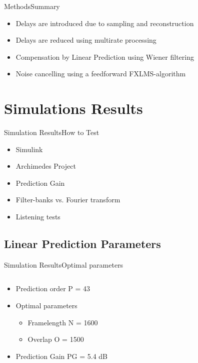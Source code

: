 \begin{frame}{Methods}{Summary}	
\begin{itemize}
	\item Delays are introduced due to sampling and reconstruction
	\item Delays are reduced using multirate processing
	\item Compensation by Linear Prediction using Wiener filtering
	\item Noise cancelling using a feedforward FXLMS-algorithm
\end{itemize}
\end{frame}










\section{Simulations Results}


\begin{frame}{Simulation Results}{How to Test}	
\begin{itemize}
	\item Simulink 
	\item Archimedes Project
	\item Prediction Gain
	\item Filter-banks vs. Fourier transform
	\item Listening tests			
\end{itemize}
\end{frame}

\subsection{Linear Prediction Parameters}
\begin{frame}{Simulation Results}{Optimal parameters}		
\begin{columns}
	\begin{column}{0.4\textwidth}
		\begin{itemize}
			\item Prediction order P = 43
			\item Optimal parameters
			\begin{itemize}
				\item Framelength N = 1600
				\item Overlap O = 1500
			\end{itemize}
			\item Prediction Gain PG = 5.4 dB
		\end{itemize}
	\end{column}
	\begin{column}{0.6\textwidth} 
		\resizebox{0.9\columnwidth}{!}{		
			}
	\end{column}
\end{columns}
\end{frame}

